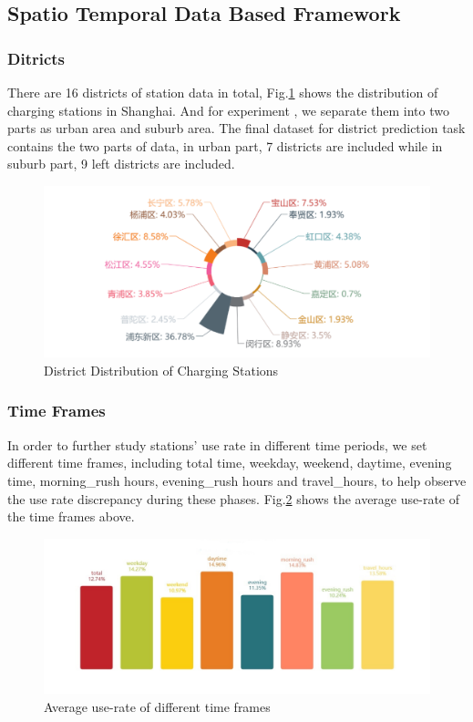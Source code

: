 \subsection{Spatio Temporal Data Based Framework}

\subsubsection{Ditricts}
There are 16 districts of station data in total, Fig.\ref{fig6} shows the distribution of charging stations in Shanghai. And for experiment , we separate them into two parts as urban area and suburb area. The final dataset for district prediction task contains the two parts of data, in urban part, 7 districts are included while in suburb part, 9 left districts are included.
\begin{figure}[!htp]
	\includegraphics[width=\columnwidth]{./figures/distribution.pdf}
	\centering
	\caption{District Distribution of Charging Stations}
	\label{fig6}
\end{figure}
\subsubsection{Time Frames}
In order to further study stations' use rate in different time periods, we set different time frames, including total time, weekday, weekend, daytime, evening time, morning\_rush hours, evening\_rush hours and travel\_hours, to help observe the use rate discrepancy during these phases. Fig.\ref{fig7} shows the average use-rate of the time frames above.
\begin{figure}[!htp]
	\includegraphics[width=\columnwidth]{./figures/timeframes.pdf}
	\centering
	\caption{Average use-rate of different time frames}
	\label{fig7}
\end{figure}

